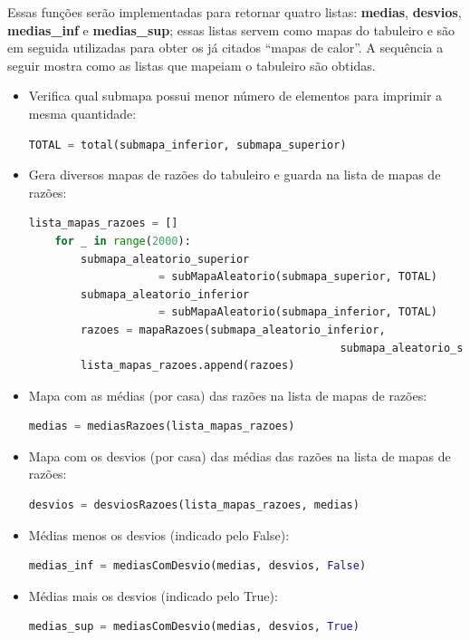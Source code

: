 \documentclass[12pt]{article}
\newcommand{\aspas}[1]{``#1''} %
\begin{document}
Essas funções serão implementadas para retornar quatro listas: \textbf{medias}, \textbf{desvios}, \textbf{medias\_inf} e \textbf{medias\_sup}; essas listas servem como mapas do tabuleiro e são em seguida utilizadas para obter os já citados \aspas{mapas de calor}. A sequência a seguir mostra como as listas que mapeiam o tabuleiro são obtidas.

\begin{itemize}
	\item Verifica qual submapa possui menor número de elementos para imprimir a mesma quantidade:
	\begin{lstlisting}[language=Python]
	TOTAL = total(submapa_inferior, submapa_superior)
	\end{lstlisting}
	
	\item Gera diversos mapas de razões do tabuleiro e guarda na lista de mapas de razões:
	\begin{lstlisting}[language=Python]
	lista_mapas_razoes = []
	for _ in range(2000):
		submapa_aleatorio_superior 
					= subMapaAleatorio(submapa_superior, TOTAL)
		submapa_aleatorio_inferior 
					= subMapaAleatorio(submapa_inferior, TOTAL)
		razoes = mapaRazoes(submapa_aleatorio_inferior, 
												submapa_aleatorio_superior)
		lista_mapas_razoes.append(razoes)
	\end{lstlisting}
	
	\item Mapa com as médias (por casa) das razões na lista de mapas de razões:
	\begin{lstlisting}[language=Python]
	medias = mediasRazoes(lista_mapas_razoes)
	\end{lstlisting}
	
	\item Mapa com os desvios (por casa) das médias das razões na lista de mapas de razões:
	\begin{lstlisting}[language=Python]
	desvios = desviosRazoes(lista_mapas_razoes, medias)
	\end{lstlisting}
	
	\item Médias menos os desvios (indicado pelo False):
	\begin{lstlisting}[language=Python]
	medias_inf = mediasComDesvio(medias, desvios, False)
	\end{lstlisting}
	
	\item Médias mais os desvios (indicado pelo True):
	\begin{lstlisting}[language=Python]
	medias_sup = mediasComDesvio(medias, desvios, True)
	\end{lstlisting}
\end{itemize}
\end{document}
